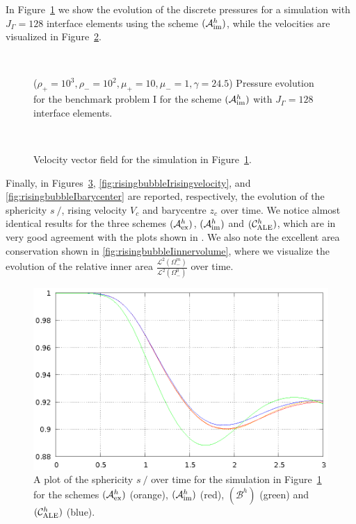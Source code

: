 \documentclass[a4paper,12pt,onecolumn]{article}
\newcommand{\strikes}{\mbox{$s\!\!\!\!\:/$}}
\newcommand{\schemeAex}{{\mathcal{A}^h_{\rm ex}}}
\newcommand{\schemeAim}{{\mathcal{A}^h_{\rm im}}}
\newcommand{\schemeB}{{\mathcal{B}^h}}
\newcommand{\schemeALE}{{\mathcal{C}^h_{\rm ALE}}}
\begin{document}
In Figure~\ref{fig:risingbubbleIpressure} we show the evolution of the discrete
pressures for a simulation with $J_\Gamma=128$ interface elements using the
scheme $(\schemeAim)$, while the velocities are visualized in
Figure~\ref{fig:risingbubbleIvelocity}.
\begin{figure}[htbp]
\centering
{}
\\
\caption{($\rho_+ = 10^3,\rho_- = 10^2,\mu_+ = 10,\mu_- =1,\gamma = 24.5$)
Pressure evolution for the benchmark problem I for the scheme $(\schemeAim)$
with $J_\Gamma=128$ interface elements.}
\label{fig:risingbubbleIpressure}
\end{figure}%
\begin{figure}[htbp]
\centering
{}
\\
\caption{Velocity vector field for the simulation in
Figure~\ref{fig:risingbubbleIpressure}.}
\label{fig:risingbubbleIvelocity}
\end{figure}%
Finally, in Figures~\ref{fig:risingbubbleIsphericity},
\ref{fig:risingbubbleIrisingvelocity}, and \ref{fig:risingbubbleIbarycenter}
are reported, respectively, the evolution of
the sphericity $\strikes$, rising velocity $V_c$ and barycentre $z_c$ over
time. We notice almost identical results for the three schemes
$(\schemeAex)$, $(\schemeAim)$ and $(\schemeALE)$, which are in very good
agreement with the plots shown in \cite{HysingTKPBGT09}. We also note the
excellent area conservation shown in \ref{fig:risingbubbleIinnervolume},
where we visualize the evolution of the relative
inner area $\frac{\mathcal{L}^2(\Omega^m_-)}{\mathcal{L}^2(\Omega^0_-)}$
over time.
\begin{figure}[htbp]
\centering
\includegraphics[width=.45\textwidth]
{figures/rising_bubble_I_sphericity.ps}
\caption{A plot of the sphericity $\strikes$ over time for the simulation in
Figure~\ref{fig:risingbubbleIpressure} for the schemes
$(\schemeAex)$ (orange), $(\schemeAim)$ (red), $(\schemeB)$ (green) and
$(\schemeALE)$ (blue).}
\label{fig:risingbubbleIsphericity}
\end{figure}%
\end{document}
